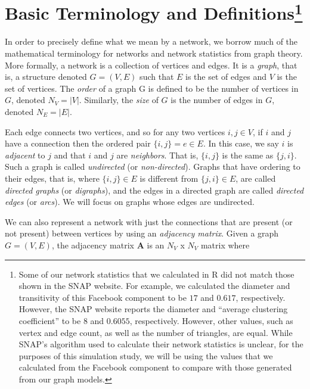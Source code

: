 \documentclass[12pt,twoside]{amherstthesis}
\begin{document}
  \section[Basic Terminology and Definitions]{\texorpdfstring{Basic
  Terminology and Definitions\footnote{Some of our network statistics that
    we calculated in R did not match those shown in the SNAP website. For
    example, we calculated the diameter and transitivity of this Facebook
    component to be \(17\) and \(0.617\), respectively. However, the SNAP
    website reports the diameter and ``average clustering coefficient'' to
    be \(8\) and \(0.6055\), respectively. However, other values, such as
    vertex and edge count, as well as the number of triangles, are equal.
    While SNAP's algorithm used to calculate their network statistics is
    unclear, for the purposes of this simulation study, we will be using
    the values that we calculated from the Facebook component to compare
    with those generated from our graph models.}}{Basic Terminology and Definitions}}\label{basic-terminology-and-definitions-1}
  
  In order to precisely define what we mean by a network, we borrow much
  of the mathematical terminology for networks and network statistics from
  graph theory. More formally, a network is a collection of vertices and
  edges. It is a \emph{graph}, that is, a structure denoted \(G = (V, E)\)
  such that \(E\) is the set of edges and \(V\) is the set of vertices.
  The \emph{order} of a graph G is defined to be the number of vertices in
  \(G\), denoted \(N_V = |V|\). Similarly, the \emph{size} of \(G\) is the
  number of edges in \(G\), denoted \(N_E = |E|\).
  
  Each edge connects two vertices, and so for any two vertices
  \(i, j \in V\), if \(i\) and \(j\) have a connection then the ordered
  pair \(\{i, j\} = e \in E\). In this case, we say \(i\) is
  \emph{adjacent} to \(j\) and that \(i\) and \(j\) are \emph{neighbors}.
  That is, \(\{i, j\}\) is the same as \(\{j, i\}\). Such a graph is
  called \emph{undirected} (or \emph{non-directed}). Graphs that have
  ordering to their edges, that is, where \(\{i, j\} \in E\) is different
  from \(\{j, i\} \in E\), are called \emph{directed graphs} (or
  \emph{digraphs}), and the edges in a directed graph are called
  \emph{directed edges} (or \emph{arcs}). We will focus on graphs whose
  edges are undirected.
  
  We can also represent a network with just the connections that are
  present (or not present) between vertices by using an \emph{adjacency
  matrix}. Given a graph \(G = (V, E)\), the adjacency matrix
  \(\textbf{A}\) is an \(N_V\) x \(N_V\) matrix where
  
\end{document}
